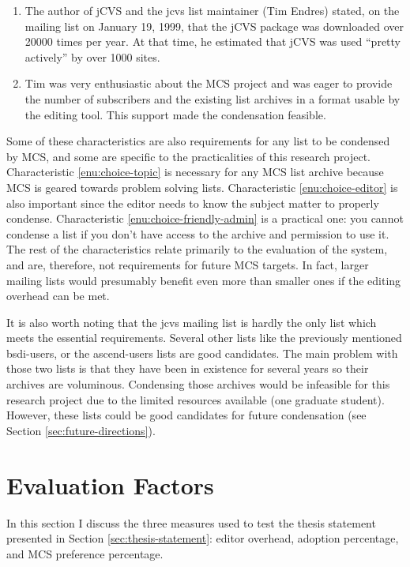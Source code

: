\begin{enumerate}
\item The author of jCVS and the jcvs list maintainer (Tim Endres) stated, on
  the mailing list on January 19, 1999, that the jCVS package was downloaded
  over 20000 times per year. At that time, he estimated that jCVS was used
  ``pretty actively'' by over 1000 sites.
  
\item Tim was very enthusiastic about the MCS project and was eager to provide
  the number of subscribers and the existing list archives in a format usable
  by the editing tool. This support made the condensation feasible.
  \label{enu:choice-friendly-admin}
\end{enumerate}

Some of these characteristics are also requirements for any list to be
condensed by MCS, and some are specific to the practicalities of this research
project. Characteristic \ref{enu:choice-topic} is necessary for any MCS list
archive because MCS is geared towards problem solving lists. Characteristic
\ref{enu:choice-editor} is also important since the editor needs to know the
subject matter to properly condense. Characteristic
\ref{enu:choice-friendly-admin} is a practical one: you cannot condense a list
if you don't have access to the archive and permission to use it. The rest of
the characteristics relate primarily to the evaluation of the system, and are,
therefore, not requirements for future MCS targets. In fact, larger mailing
lists would presumably benefit even more than smaller ones if the editing
overhead can be met.

It is also worth noting that the jcvs mailing list is hardly the only list
which meets the essential requirements. Several other lists like the previously
mentioned bsdi-users, or the ascend-users lists are good candidates. The main
problem with those two lists is that they have been in existence for several
years so their archives are voluminous. Condensing those archives would be
infeasible for this research project due to the limited resources available
(one graduate student). However, these lists \cite{nexial-mailinglists} could
be good candidates for future condensation (see Section
\ref{sec:future-directions}).

\section{Evaluation Factors}
\label{sec:evaluation-factors}
In this section I discuss the three measures used to test the thesis statement
presented in Section \ref{sec:thesis-statement}: editor overhead, adoption
percentage, and MCS preference percentage.

